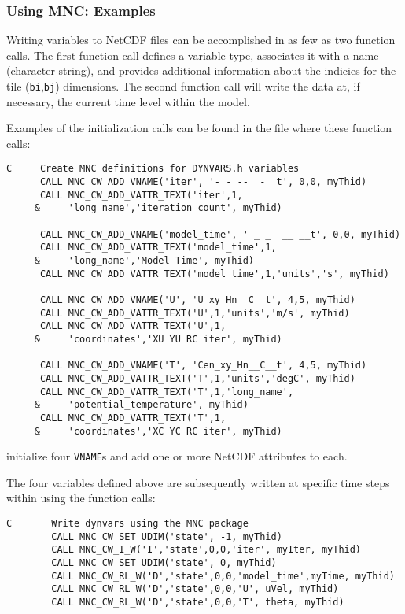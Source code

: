 \subsubsection{Using MNC: Examples}

Writing variables to NetCDF files can be accomplished in as few as two
function calls.  The first function call defines a variable type,
associates it with a name (character string), and provides additional
information about the indicies for the tile (\texttt{bi},\texttt{bj})
dimensions.  The second function call will write the data at, if
necessary, the current time level within the model.

Examples of the initialization calls can be found in the file 
where these function calls:
{\footnotesize
\begin{verbatim}
C     Create MNC definitions for DYNVARS.h variables
      CALL MNC_CW_ADD_VNAME('iter', '-_-_--__-__t', 0,0, myThid)
      CALL MNC_CW_ADD_VATTR_TEXT('iter',1,
     &     'long_name','iteration_count', myThid)

      CALL MNC_CW_ADD_VNAME('model_time', '-_-_--__-__t', 0,0, myThid)
      CALL MNC_CW_ADD_VATTR_TEXT('model_time',1,
     &     'long_name','Model Time', myThid)
      CALL MNC_CW_ADD_VATTR_TEXT('model_time',1,'units','s', myThid)

      CALL MNC_CW_ADD_VNAME('U', 'U_xy_Hn__C__t', 4,5, myThid)
      CALL MNC_CW_ADD_VATTR_TEXT('U',1,'units','m/s', myThid)
      CALL MNC_CW_ADD_VATTR_TEXT('U',1,
     &     'coordinates','XU YU RC iter', myThid)

      CALL MNC_CW_ADD_VNAME('T', 'Cen_xy_Hn__C__t', 4,5, myThid)
      CALL MNC_CW_ADD_VATTR_TEXT('T',1,'units','degC', myThid)
      CALL MNC_CW_ADD_VATTR_TEXT('T',1,'long_name',
     &     'potential_temperature', myThid)
      CALL MNC_CW_ADD_VATTR_TEXT('T',1,
     &     'coordinates','XC YC RC iter', myThid)
\end{verbatim}
}
{\noindent initialize four \texttt{VNAME}s and add one or more NetCDF
  attributes to each.}
    
The four variables defined above are subsequently written at specific
time steps within
using the function calls:
{\footnotesize
\begin{verbatim}
C       Write dynvars using the MNC package
        CALL MNC_CW_SET_UDIM('state', -1, myThid)
        CALL MNC_CW_I_W('I','state',0,0,'iter', myIter, myThid)
        CALL MNC_CW_SET_UDIM('state', 0, myThid)
        CALL MNC_CW_RL_W('D','state',0,0,'model_time',myTime, myThid)
        CALL MNC_CW_RL_W('D','state',0,0,'U', uVel, myThid)
        CALL MNC_CW_RL_W('D','state',0,0,'T', theta, myThid)
\end{verbatim}
}


